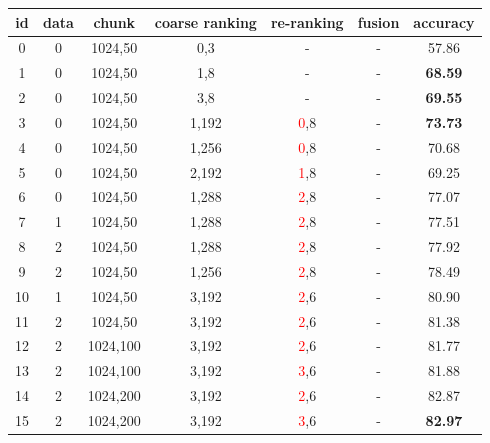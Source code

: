 \documentclass[11pt]{article}
\def\retrievaltextcircled#1{\large{\textcircled{\small{\color{blue}#1}}}\normalsize}
\def\reranktextcircled#1{\large{\textcircled{\small{\textcolor{red}{#1}}}}\normalsize}
\def\datatextcircled#1{\large{\textcircled{\small{#1}}}\normalsize}
\begin{document}
\begin{table}[ht!]
\setlength{\tabcolsep}{13pt}
\centering
\begin{tabular}{ccccccc}
\toprule
\textbf{id} & \textbf{data} & \textbf{chunk} & \textbf{coarse ranking} & \textbf{re-ranking} & \textbf{fusion} & \textbf{accuracy} \\
\midrule
0 & \datatextcircled{0} & 1024,50  & \retrievaltextcircled{0},3 & - & - & 57.86 \\
1 & \datatextcircled{0} & 1024,50 & \retrievaltextcircled{1},8 & - & - & \textbf{68.59} \\
2 & \datatextcircled{0} & 1024,50 & \retrievaltextcircled{3},8 & - & - & \textbf{69.55} \\
\midrule
3 & \datatextcircled{0} & 1024,50 & \retrievaltextcircled{1},192 & \reranktextcircled{0},8 & - & \textbf{73.73} \\
4 & \datatextcircled{0} & 1024,50 & \retrievaltextcircled{1},256 & \reranktextcircled{0},8 & - & 70.68 \\
5 & \datatextcircled{0} & 1024,50 & \retrievaltextcircled{2},192 & \reranktextcircled{1},8 & - & 69.25 \\
\midrule
6 & \datatextcircled{0} & 1024,50 & \retrievaltextcircled{1},288 & \reranktextcircled{2},8 & - & 77.07 \\
7 & \datatextcircled{1} & 1024,50 & \retrievaltextcircled{1},288 &\reranktextcircled{2},8 & - & 77.51 \\
8 & \datatextcircled{2} & 1024,50 & \retrievaltextcircled{1},288 &\reranktextcircled{2},8 & - & 77.92 \\
9 & \datatextcircled{2} & 1024,50 & \retrievaltextcircled{1},256 &\reranktextcircled{2},8 & - & 78.49 \\
10 & \datatextcircled{1} & 1024,50 & \retrievaltextcircled{3},192 &\reranktextcircled{2},6 & - & 80.90 \\
11 & \datatextcircled{2} & 1024,50 & \retrievaltextcircled{3},192 &\reranktextcircled{2},6 & - & 81.38 \\
12 & \datatextcircled{2} & 1024,100 & \retrievaltextcircled{3},192 &\reranktextcircled{2},6 & - & 81.77 \\
13 & \datatextcircled{2} & 1024,100 & \retrievaltextcircled{3},192 &\reranktextcircled{3},6 & - & 81.88 \\
14 & \datatextcircled{2} & 1024,200 & \retrievaltextcircled{3},192 &\reranktextcircled{2},6 & - & 82.87 \\
15 & \datatextcircled{2} & 1024,200 & \retrievaltextcircled{3},192 &\reranktextcircled{3},6 & - & \textbf{82.97} \\

\end{tabular}
\end{table}
\end{document}
